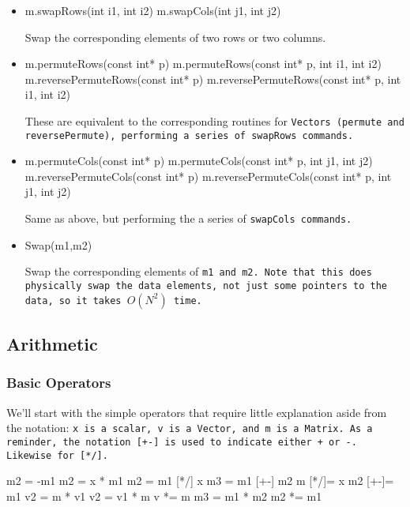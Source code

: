 \begin{itemize}
\item
\begin{tmvcode}
m.swapRows(int i1, int i2)
m.swapCols(int j1, int j2)
\end{tmvcode}
Swap the corresponding elements of two rows or two columns.

\item
\begin{tmvcode}
m.permuteRows(const int* p)
m.permuteRows(const int* p, int i1, int i2)
m.reversePermuteRows(const int* p)
m.reversePermuteRows(const int* p, int i1, int i2)
\end{tmvcode}
These are equivalent to the corresponding routines for \tt{Vector}s 
(\tt{permute} and \tt{reversePermute}), performing a series of \tt{swapRows} commands.

\item
\begin{tmvcode}
m.permuteCols(const int* p)
m.permuteCols(const int* p, int j1, int j2)
m.reversePermuteCols(const int* p)
m.reversePermuteCols(const int* p, int j1, int j2)
\end{tmvcode}
Same as above, but performing the a series of \tt{swapCols} commands.

\item
\begin{tmvcode}
Swap(m1,m2)
\end{tmvcode}
Swap the corresponding elements of \tt{m1} and \tt{m2}.  Note that this does physically
swap the data elements, not just some pointers to the data, so it takes $O(N^2)$ time.

\end{itemize}

\subsection{Arithmetic}
\label{Matrix_Arithmetic}

\subsubsection{Basic Operators}

We'll start with the simple operators that require little explanation aside from the 
notation: 
\tt{x} is a scalar, \tt{v} is a \tt{Vector}, and \tt{m} is a \tt{Matrix}.  As a reminder,
the notation \tt{[+-]} is used to indicate either \tt{+} or \tt{-}.  Likewise for \tt{[*/]}.
\begin{tmvcode}
m2 = -m1
m2 = x * m1
m2 = m1 [*/] x
m3 = m1 [+-] m2
m [*/]= x
m2 [+-]= m1
v2 = m * v1
v2 = v1 * m
v *= m
m3 = m1 * m2
m2 *= m1
\end{tmvcode}

